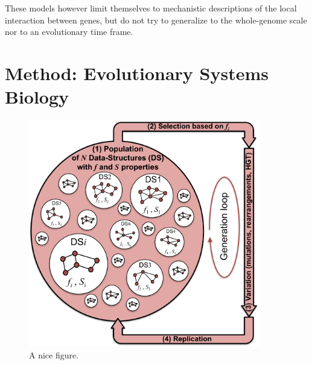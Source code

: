 These models however limit themselves to mechanistic descriptions of the local interaction between genes, but do not try to generalize to the whole-genome scale nor to an evolutionary time frame.

\section{Method: Evolutionary Systems Biology}

\begin{figure}
\centering
\includegraphics[width=0.9\textwidth]{background/img/evol_sys_bio.pdf}
\caption{A nice figure.}
\label{fig:background:evol-sys-bio}
\end{figure}


